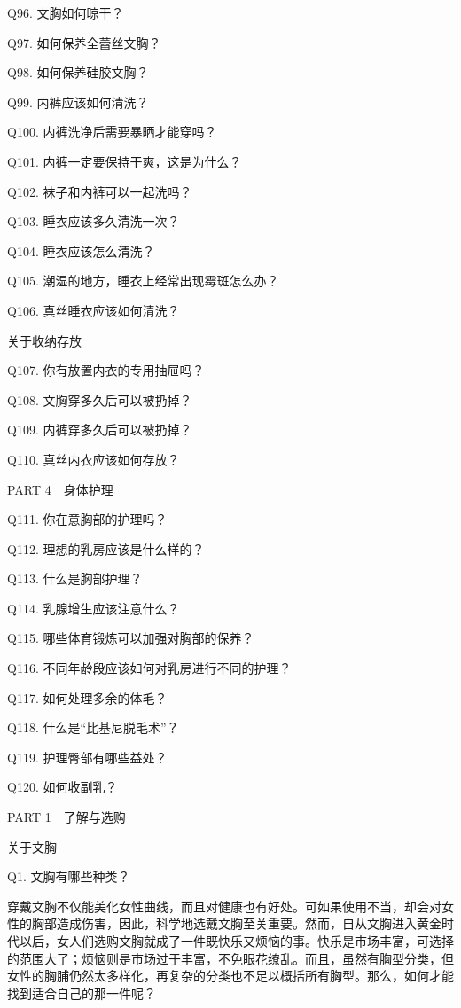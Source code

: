 \documentclass[12pt,UTF8]{ctexbook}
\begin{document}
Q96. 文胸如何晾干？

Q97. 如何保养全蕾丝文胸？

Q98. 如何保养硅胶文胸？

Q99. 内裤应该如何清洗？

Q100. 内裤洗净后需要暴晒才能穿吗？

Q101. 内裤一定要保持干爽，这是为什么？

Q102. 袜子和内裤可以一起洗吗？

Q103. 睡衣应该多久清洗一次？

Q104. 睡衣应该怎么清洗？

Q105. 潮湿的地方，睡衣上经常出现霉斑怎么办？

Q106. 真丝睡衣应该如何清洗？

关于收纳存放

Q107. 你有放置内衣的专用抽屉吗？

Q108. 文胸穿多久后可以被扔掉？

Q109. 内裤穿多久后可以被扔掉？

Q110. 真丝内衣应该如何存放？

PART 4　身体护理

Q111. 你在意胸部的护理吗？

Q112. 理想的乳房应该是什么样的？

Q113. 什么是胸部护理？

Q114. 乳腺增生应该注意什么？

Q115. 哪些体育锻炼可以加强对胸部的保养？

Q116. 不同年龄段应该如何对乳房进行不同的护理？

Q117. 如何处理多余的体毛？

Q118. 什么是“比基尼脱毛术”？

Q119. 护理臀部有哪些益处？

Q120. 如何收副乳？





PART 1　了解与选购





关于文胸


Q1. 文胸有哪些种类？


穿戴文胸不仅能美化女性曲线，而且对健康也有好处。可如果使用不当，却会对女性的胸部造成伤害，因此，科学地选戴文胸至关重要。然而，自从文胸进入黄金时代以后，女人们选购文胸就成了一件既快乐又烦恼的事。快乐是市场丰富，可选择的范围大了；烦恼则是市场过于丰富，不免眼花缭乱。而且，虽然有胸型分类，但女性的胸脯仍然太多样化，再复杂的分类也不足以概括所有胸型。那么，如何才能找到适合自己的那一件呢？
\end{document}
